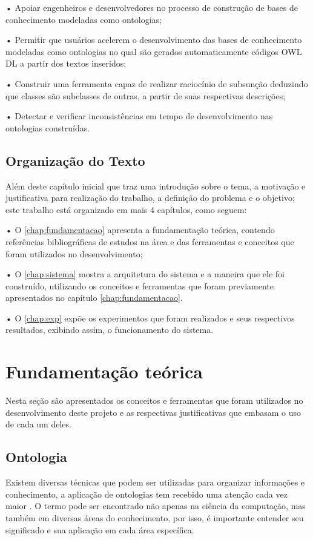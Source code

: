 \documentclass{bcc}
\begin{document}
•	Apoiar engenheiros e desenvolvedores no processo de construção de bases de conhecimento modeladas como ontologias;

•	Permitir que usuários acelerem o desenvolvimento das bases de conhecimento modeladas como ontologias no qual são gerados automaticamente códigos OWL DL a partir dos textos inseridos;

•	Construir uma ferramenta capaz de realizar raciocínio de subsunção deduzindo que classes são subclasses de outras, a partir de suas respectivas descrições;

•	Detectar e verificar inconsistências em tempo de desenvolvimento nas ontologias construídas.

\section{Organização do Texto}

Além deste capítulo inicial que traz uma introdução sobre o tema, a motivação e justificativa para realização do trabalho, a definição do problema e o objetivo; este trabalho está organizado em mais 4 capítulos, como seguem:

• O \autoref{chap:fundamentacao} apresenta a fundamentação teórica, contendo referências bibliográficas de estudos na área e das ferramentas e conceitos que foram utilizados no desenvolvimento;

• O \autoref{chap:sistema} mostra a arquitetura do sistema e a maneira que ele foi construído, utilizando os conceitos e ferramentas que foram previamente apresentados no capítulo \autoref{chap:fundamentacao}.

• O \autoref{chap:exp} expõe os experimentos que foram realizados e seus respectivos resultados, exibindo assim, o funcionamento do sistema.


\chapter{Fundamentação teórica}
\label{chap:fundamentacao}

Nesta seção são apresentados os conceitos e ferramentas que foram utilizados no desenvolvimento deste projeto e as respectivas justificativas que embasam o uso de cada um deles.

\section{Ontologia}

Existem diversas técnicas que podem ser utilizadas para organizar informações e conhecimento, a aplicação de ontologias tem recebido uma atenção cada vez maior \cite{almeida2014}. O termo pode ser encontrado não apenas na ciência da computação, mas também em diversas áreas do conhecimento, por isso, é importante entender seu significado e sua aplicação em cada área específica.
\end{document}
